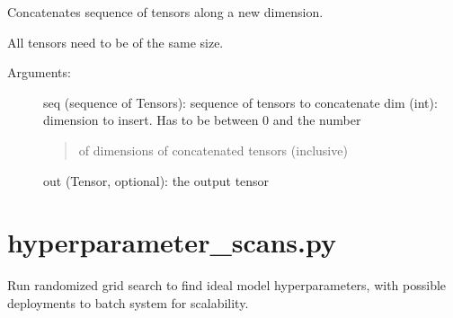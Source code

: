 \documentclass[letterpaper,10pt,english]{sphinxmanual}
\begin{document}

\begin{fulllineitems}
\label{\detokenize{index:methylnet.datasets.stack}}
Concatenates sequence of tensors along a new dimension.

All tensors need to be of the same size.
\begin{description}
\item[{Arguments:}] \leavevmode
seq (sequence of Tensors): sequence of tensors to concatenate
dim (int): dimension to insert. Has to be between 0 and the number
\begin{quote}

of dimensions of concatenated tensors (inclusive)
\end{quote}

out (Tensor, optional): the output tensor

\end{description}

\end{fulllineitems}

\label{\detokenize{index:module-methylnet.hyperparameter_scans}}

\chapter{hyperparameter\_scans.py}
\label{\detokenize{index:hyperparameter-scans-py}}
Run randomized grid search to find ideal model hyperparameters, with possible deployments to batch system for scalability.
\end{document}

